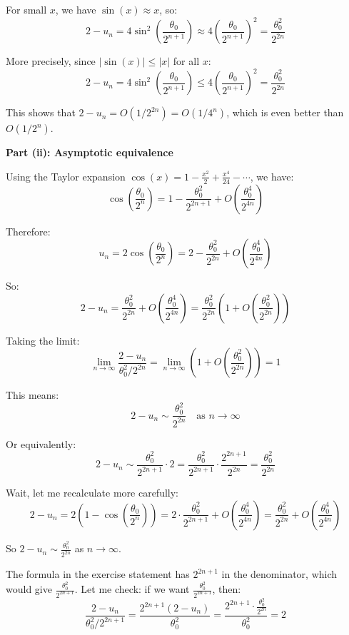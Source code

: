 \documentclass[12pt,a4paper]{article}
\theoremstyle{definition}
\begin{document}
For small $x$, we have $\sin(x) \approx x$, so:
\[
2 - u_n = 4\sin^2\left(\frac{\theta_0}{2^{n+1}}\right) \approx 4\left(\frac{\theta_0}{2^{n+1}}\right)^2 = \frac{\theta_0^2}{2^{2n}}
\]

More precisely, since $|\sin(x)| \leq |x|$ for all $x$:
\[
2 - u_n = 4\sin^2\left(\frac{\theta_0}{2^{n+1}}\right) \leq 4\left(\frac{\theta_0}{2^{n+1}}\right)^2 = \frac{\theta_0^2}{2^{2n}}
\]

This shows that $2 - u_n = O(1/2^{2n}) = O(1/4^n)$, which is even better than $O(1/2^n)$.

\textbf{Part (ii): Asymptotic equivalence}

Using the Taylor expansion $\cos(x) = 1 - \frac{x^2}{2} + \frac{x^4}{24} - \cdots$, we have:
\[
\cos\left(\frac{\theta_0}{2^n}\right) = 1 - \frac{\theta_0^2}{2^{2n+1}} + O\left(\frac{\theta_0^4}{2^{4n}}\right)
\]

Therefore:
\[
u_n = 2\cos\left(\frac{\theta_0}{2^n}\right) = 2 - \frac{\theta_0^2}{2^{2n}} + O\left(\frac{\theta_0^4}{2^{4n}}\right)
\]

So:
\[
2 - u_n = \frac{\theta_0^2}{2^{2n}} + O\left(\frac{\theta_0^4}{2^{4n}}\right) = \frac{\theta_0^2}{2^{2n}}\left(1 + O\left(\frac{\theta_0^2}{2^{2n}}\right)\right)
\]

Taking the limit:
\[
\lim_{n \to \infty} \frac{2 - u_n}{\theta_0^2/2^{2n}} = \lim_{n \to \infty} \left(1 + O\left(\frac{\theta_0^2}{2^{2n}}\right)\right) = 1
\]

This means:
\[
2 - u_n \sim \frac{\theta_0^2}{2^{2n}} \quad \text{as } n \to \infty
\]

Or equivalently:
\[
2 - u_n \sim \frac{\theta_0^2}{2^{2n+1}} \cdot 2 = \frac{\theta_0^2}{2^{2n+1}} \cdot \frac{2^{2n+1}}{2^{2n}} = \frac{\theta_0^2}{2^{2n}}
\]

Wait, let me recalculate more carefully:
\[
2 - u_n = 2\left(1 - \cos\left(\frac{\theta_0}{2^n}\right)\right) = 2 \cdot \frac{\theta_0^2}{2^{2n+1}} + O\left(\frac{\theta_0^4}{2^{4n}}\right) = \frac{\theta_0^2}{2^{2n}} + O\left(\frac{\theta_0^4}{2^{4n}}\right)
\]

So $2 - u_n \sim \frac{\theta_0^2}{2^{2n}}$ as $n \to \infty$.

The formula in the exercise statement has $2^{2n+1}$ in the denominator, which would give $\frac{\theta_0^2}{2^{2n+1}}$. Let me check: if we want $\frac{\theta_0^2}{2^{2n+1}}$, then:
\[
\frac{2 - u_n}{\theta_0^2/2^{2n+1}} = \frac{2^{2n+1}(2 - u_n)}{\theta_0^2} = \frac{2^{2n+1} \cdot \frac{\theta_0^2}{2^{2n}}}{\theta_0^2} = 2
\]
\end{document}
